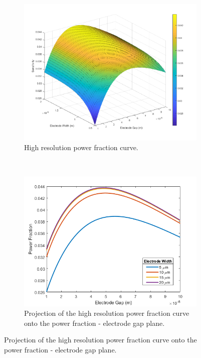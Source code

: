 \begin{figure}[h]
    \centering
    \begin{subfigure}[b]{0.6\textwidth}
        \centering
        \includegraphics[width=\textwidth]{images/hiResPowerSensitivity.png}
        \caption{High resolution power fraction curve.}
    \end{subfigure}
    \\
    \vspace{0.1 in}
    \begin{subfigure}[b]{0.49\textwidth}
        \centering
        \includegraphics[width=\textwidth]{images/hiResPowerVsGap.png}
        \caption{Projection of the high resolution power fraction curve onto the power fraction - electrode gap plane.}

\end{subfigure}
\end{figure}

